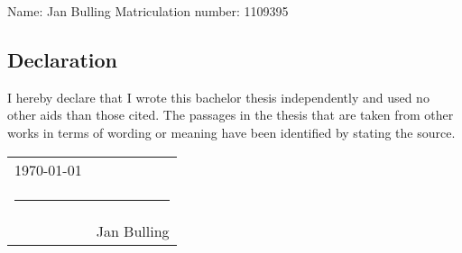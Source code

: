 \thispagestyle{empty}
{\footnotesize Name: Jan Bulling \hfill Matriculation number: 1109395}

\vspace{3cm}

\subsection*{Declaration}
I hereby declare that I wrote this bachelor thesis independently and used no other aids than those cited. The passages in the thesis that are taken from other works in terms of wording or meaning have been identified by stating the source.


\vspace*{4em}\noindent
\hfill
\begin{tabular}[t]{l r}
  \today & \\[-10pt]
  \multicolumn{2}{c}{\rule{30em}{0.4pt}} \\ 
  & Jan Bulling
\end{tabular}
\hfill\strut
